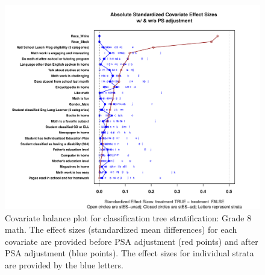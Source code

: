 \begin{figure}
\begin{center}
\includegraphics[width=\textwidth]{../Figures2009/g8math-tree-balance.pdf}
\caption[Covariate balance plot for classification tree stratification: Grade 8 math]{Covariate balance plot for classification tree stratification: Grade 8 math. The effect sizes (standardized mean differences) for each covariate are provided before PSA adjustment (red points) and after PSA adjustment (blue points). The effect sizes for individual strata are provided by the blue letters.}
\end{center}
\end{figure}

